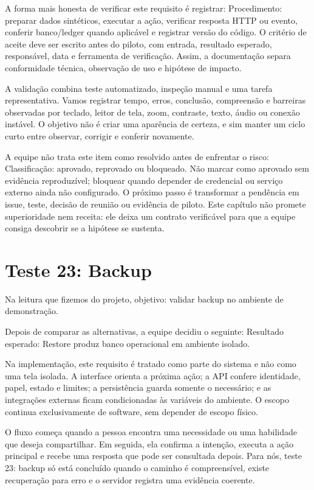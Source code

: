 \documentclass[12pt,oneside,a4paper,article]{abntex2}
\begin{document}
A forma mais honesta de verificar este requisito é registrar: Procedimento: preparar dados sintéticos, executar a ação, verificar resposta HTTP ou evento, conferir banco/ledger quando aplicável e registrar versão do código. O critério de aceite deve ser escrito antes do piloto, com entrada, resultado esperado, responsável, data e ferramenta de verificação. Assim, a documentação separa conformidade técnica, observação de uso e hipótese de impacto.

A validação combina teste automatizado, inspeção manual e uma tarefa representativa. Vamos registrar tempo, erros, conclusão, compreensão e barreiras observadas por teclado, leitor de tela, zoom, contraste, texto, áudio ou conexão instável. O objetivo não é criar uma aparência de certeza, e sim manter um ciclo curto entre observar, corrigir e conferir novamente.

A equipe não trata este item como resolvido antes de enfrentar o risco: Classificação: aprovado, reprovado ou bloqueado. Não marcar como aprovado sem evidência reproduzível; bloquear quando depender de credencial ou serviço externo ainda não configurado. O próximo passo é transformar a pendência em issue, teste, decisão de reunião ou evidência de piloto. Este capítulo não promete superioridade nem receita: ele deixa um contrato verificável para que a equipe consiga descobrir se a hipótese se sustenta.

\section{Teste 23: Backup}
Na leitura que fizemos do projeto, objetivo: validar backup no ambiente de demonstração.

Depois de comparar as alternativas, a equipe decidiu o seguinte: Resultado esperado: Restore produz banco operacional em ambiente isolado.

Na implementação, este requisito é tratado como parte do sistema e não como uma tela isolada. A interface orienta a próxima ação; a API confere identidade, papel, estado e limites; a persistência guarda somente o necessário; e as integrações externas ficam condicionadas às variáveis do ambiente. O escopo continua exclusivamente de software, sem depender de escopo físico.

O fluxo começa quando a pessoa encontra uma necessidade ou uma habilidade que deseja compartilhar. Em seguida, ela confirma a intenção, executa a ação principal e recebe uma resposta que pode ser consultada depois. Para nós, teste 23: backup só está concluído quando o caminho é compreensível, existe recuperação para erro e o servidor registra uma evidência coerente.
\end{document}

